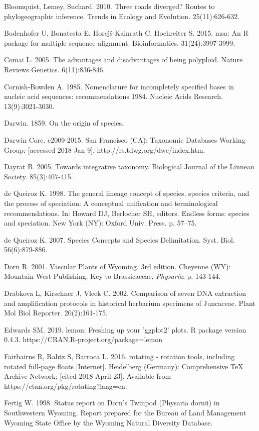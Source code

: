 Bloomquist, Lemey, Suchard. 2010. Three roads diverged? Routes to phylogeographic inference. Trends in Ecology and Evolution. 25(11):626-632.

Bodenhofer U, Bonatesta E, Horej\v{s}-Kainrath C, Hochreiter S. 2015. msa: An R package for multiple sequence alignment. Bioinformatics. 31(24):3997-3999.

Comai L. 2005. The advantages and disadvantages of being polyploid. Nature Reviews Genetics. 6(11):836-846.

Cornish-Bowden A. 1985. Nomenclature for incompletely specified bases in nucleic acid sequences: recommendations 1984.  Nucleic Acids Research. 13(9):3021-3030.

Darwin. 1859. On the origin of species.

Darwin Core. c2009-2015. San Francisco (CA): Taxonomic Databases Working Group; [accessed 2018 Jan 9]. http://rs.tdwg.org/dwc/index.htm.

Dayrat B. 2005. Towards integrative taxonomy. Biological Journal of the Linnean Society. 85(3):407-415.

de Queiroz K. 1998. The general lineage concept of species, species criteria, and the process of speciation: A conceptual unification and terminological recommendations. In: Howard DJ, Berlocher SH, editors. Endless forms: species and speciation. New York (NY): Oxford Univ. Press. p. 57–75.

de Queiroz K. 2007. Species Concepts and Species Delimitation. Syst. Biol. 56(6):879-886.

Dorn R. 2001. Vascular Plants of Wyoming. 3rd edition. Cheyenne (WY): Mountain West Publishing. Key to Brassicaceae, \textit{Physaria}; p. 143-144.

Drabkova L, Kirschner J, Vlcek C. 2002. Comparison of seven DNA extraction and amplification protocols in historical herbarium specimens of Juncaceae. Plant Mol Biol Reporter. 20(2):161-175.

Edwards SM. 2019. lemon: Freshing up your 'ggplot2' plots. R package version 0.4.3. https://CRAN.R-project.org/package=lemon

Fairbairns R, Rahtz S, Barroca L. 2016. rotating - rotation tools, including rotated full-page floats [Internet]. Heidelberg (Germany): Comprehensive TeX Archive Network; [cited 2018 April 23]. Available from https://ctan.org/pkg/rotating?lang=en.

Fertig W. 1998. Status report on Dorn’s Twinpod (Physaria dornii) in Southwestern Wyoming. Report prepared for the Bureau of Land Management Wyoming State Office by the Wyoming Natural Diversity Database.

